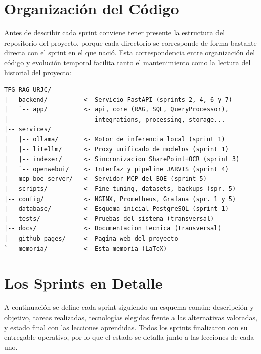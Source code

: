 \section{Organización del Código}
\label{sec:organizacion-codigo}

Antes de describir cada sprint conviene tener presente la estructura del repositorio del proyecto, porque cada directorio se corresponde de forma bastante directa con el sprint en el que nació. Esta correspondencia entre organización del código y evolución temporal facilita tanto el mantenimiento como la lectura del historial del proyecto:

\begin{lstlisting}[numbers=none, basicstyle=\ttfamily\footnotesize, caption={Estructura del repositorio y sprint en el que se desarrolló cada componente.}, label={lst:estructura-repo}]
TFG-RAG-URJC/
|-- backend/          <- Servicio FastAPI (sprints 2, 4, 6 y 7)
|   `-- app/          <- api, core (RAG, SQL, QueryProcessor),
|                        integrations, processing, storage...
|-- services/
|   |-- ollama/       <- Motor de inferencia local (sprint 1)
|   |-- litellm/      <- Proxy unificado de modelos (sprint 1)
|   |-- indexer/      <- Sincronizacion SharePoint+OCR (sprint 3)
|   `-- openwebui/    <- Interfaz y pipeline JARVIS (sprint 4)
|-- mcp-boe-server/   <- Servidor MCP del BOE (sprint 5)
|-- scripts/          <- Fine-tuning, datasets, backups (spr. 5)
|-- config/           <- NGINX, Prometheus, Grafana (spr. 1 y 5)
|-- database/         <- Esquema inicial PostgreSQL (sprint 1)
|-- tests/            <- Pruebas del sistema (transversal)
|-- docs/             <- Documentacion tecnica (transversal)
|-- github_pages/     <- Pagina web del proyecto
`-- memoria/          <- Esta memoria (LaTeX)
\end{lstlisting}

\section{Los Sprints en Detalle}
\label{sec:sprints}

A continuación se define cada sprint siguiendo un esquema común: descripción y objetivo, tareas realizadas, tecnologías elegidas frente a las alternativas valoradas, y estado final con las lecciones aprendidas. Todos los sprints finalizaron con su entregable operativo, por lo que el estado se detalla junto a las lecciones de cada uno.

